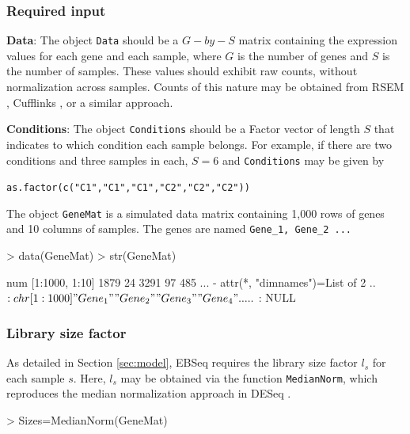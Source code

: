 \documentclass{article}
\begin{document}
\subsubsection{Required input}
\label{sec:startgenedeinput}
\begin{flushleft}
{\bf Data}:  The object \verb+Data+ should be a $G-by-S$ matrix containing the expression values for each gene and each sample,
where $G$ is the number of genes and $S$ is the number of samples. These
values should exhibit raw counts, without normalization
across samples. Counts of this nature may be obtained from RSEM \cite{Li11b},
Cufflinks \cite{Trapnell12}, or a similar approach.

\vspace{5 mm}

{\bf Conditions}:  The object \verb+Conditions+ should be a Factor vector of length $S$ that indicates to which condition each sample belongs.
For example, if there are two conditions and three samples in each,
$S=6$ and \verb+Conditions+ may be given by 

\verb+as.factor(c("C1","C1","C1","C2","C2","C2"))+

\end{flushleft} 
\noindent The object \verb+GeneMat+ is a simulated data matrix containing 
1,000 rows of genes and 10 columns of samples. The genes are named 
\verb+Gene_1, Gene_2 ...+
\begin{Schunk}
\begin{Sinput}
> data(GeneMat)
> str(GeneMat)
\end{Sinput}
\begin{Soutput}
 num [1:1000, 1:10] 1879 24 3291 97 485 ...
 - attr(*, "dimnames")=List of 2
  ..$ : chr [1:1000] "Gene_1" "Gene_2" "Gene_3" "Gene_4" ...
  ..$ : NULL
\end{Soutput}
\end{Schunk}

\subsubsection{Library size factor}
\label{sec:startgenedesize}
As detailed in Section \ref{sec:model}, EBSeq requires the library size factor $l_s$ for each sample $s$.
Here, $l_s$ may be obtained via the function \verb+MedianNorm+, which reproduces the median normalization approach
in DESeq \citep{Anders10}.
\begin{Schunk}
\begin{Sinput}
> Sizes=MedianNorm(GeneMat)
\end{Sinput}
\end{Schunk}
\end{document}
